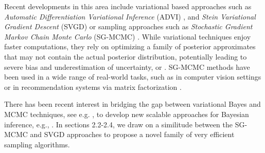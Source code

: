 Recent developments in this area include variational based approaches such as \emph{Automatic Differentiation Variational Inference} (ADVI) \parencite{blei2017variational}, and \emph{Stein Variational Gradient Descent} (SVGD)  \parencite{liu2016stein} or sampling approaches such as \emph{Stochastic Gradient Markov Chain Monte Carlo} (SG-MCMC) \parencite{ma2015complete}. While variational techniques enjoy faster computations, they rely on optimizing a family of posterior approximates that may not contain the actual posterior distribution, potentially leading to severe bias and underestimation of uncertainty, \textcite{pmlr-v80-yao18a} or \textcite{riquelme2018failure}. SG-MCMC methods have been used in a wide range of real-world tasks, such as in computer vision settings \parencite{7780980} or in recommendation systems via matrix factorization \parencite{7952555}.%

There has been recent interest in bridging the gap between variational Bayes and MCMC techniques, see e.g. \parencite{zhang2018}, to develop new scalable approaches for Bayesian inference, e.g., \parencite{carbonetto2012}.
In sections 2.2-2.4, we draw on a similitude between the SG-MCMC and SVGD approaches to propose a novel family of very efficient sampling algorithms. 

